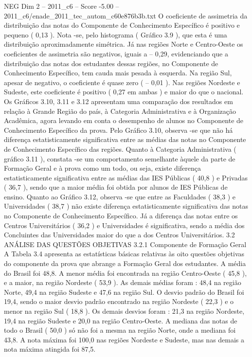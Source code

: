 \begin{textsample}{NEG Dim 2 – 2011\_c6 – Score -5.00 – 2011\_c6/enade\_2011\_tec\_autom\_c60e876b3b.txt}
O coeficiente de assimetria da distribuição das notas do Componente de Conhecimento Específico é positivo e pequeno ( 0,13 ).
Nota -se, pelo histograma ( Gráfico 3.9 ), que esta é uma distribuição aproximadamente simétrica.
Já nas regiões Norte e Centro-Oeste os coeficientes de assimetria são negativos, iguais a – 0,29, evidenciando que a distribuição das notas dos estudantes dessas regiões, no Componente de Conhecimento Específico, tem cauda mais pesada à esquerda.
Na região Sul, apesar de negativo, o coeficiente é quase zero ( – 0,01 ).
Nas regiões Nordeste e Sudeste, este coeficiente é positivo ( 0,27 em ambas ) e maior do que o nacional.
Os Gráficos 3.10, 3.11 e 3.12 apresentam uma comparação dos resultados em relação à Grande Região do país, à Categoria Administrativa e à Organização Acadêmica, agora levando em conta o desempenho de alunos no Componente de Conhecimento Específico da prova.
Pelo Gráfico 3.10, observa -se que não há diferença estatisticamente significativa entre as médias das notas no Componente de Conhecimento Específico das regiões.
Quanto à Categoria Administrativa ( gráfico 3.11 ), constata -se um comportamento semelhante àquele da parte de Formação Geral e à prova como um todo, ou seja, existe diferença estatisticamente significativa entre as médias das IES Públicas ( 40,8 ) e Privadas ( 36,7 ), sendo que a maior média foi obtida por alunos de IES Públicas de ensino.
Quanto ao Gráfico 3.12, observa -se que entre as Faculdades ( 38,3 ) e Universidades ( 38,7 ) não existe diferença estatisticamente significativa das notas no Componente de Conhecimento Específico.
Já a diferença das notas entre os Centros Universitários ( 36,2 ) e Universidades é significativa, sendo a média dos Concluintes das Universidades maior do que a dos Centros Universitários. 3.2 ANÁLISE DAS QUESTÕES OBJETIVAS 3.2.1 Componente de Formação Geral A Tabela 3.4 apresenta as estatísticas básicas relativas às oito questões objetivas do componente da prova que abrange a Formação Geral dos estudantes.
A média do Brasil foi 48,8.
A menor média foi encontrada na região Centro-Oeste ( 45,8 ), e a maior, na região Nordeste ( 53,9 ).
As demais médias foram : 48,4 na região Norte, 49,4 na região Sudeste e 47,6 na região Sul.
O desvio padrão do Brasil foi 19,4, sendo o maior desvio padrão encontrado na região Nordeste ( 22,3 ) e o menor na região Sul ( 18,8 ).
Os demais desvios foram : 21,3 na região Nordeste, 19,4 na região Sudeste e 20,0 na região Centro-Oeste.
A mediana das notas de todo o Brasil ( 50,0 ) só não foi a mesma na região Norte, onde a mediana foi 43,8.
A nota máxima foi 100,0 nas regiões Nordeste e Sudeste, mas nas demais a nota máxima atingida foi 87,5.

\end{textsample}
